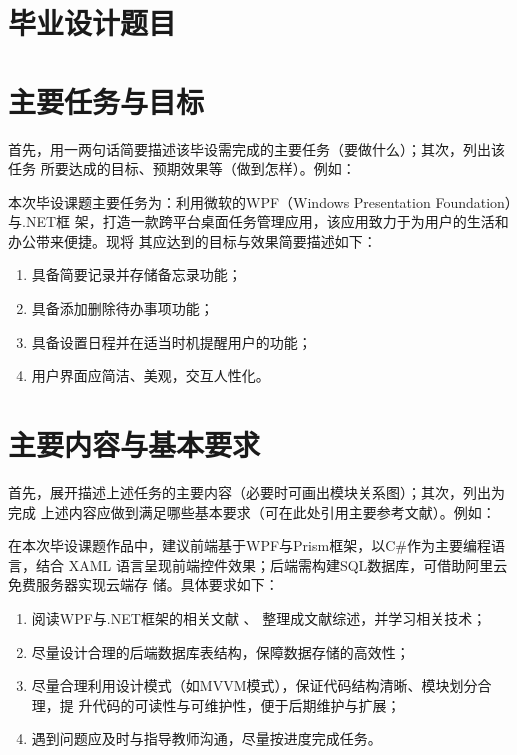 \section{毕业设计题目}

\makeatletter
\@title %
\makeatother

\section{主要任务与目标}

\begin{tcolorbox}
	首先，用一两句话简要描述该毕设需完成的主要任务（要做什么）；其次，列出该任务
	所要达成的目标、预期效果等（做到怎样）。例如：
\end{tcolorbox}

本次毕设课题主要任务为：利用微软的WPF（Windows Presentation Foundation）与.NET框
架，打造一款跨平台桌面任务管理应用，该应用致力于为用户的生活和办公带来便捷。现将
其应达到的目标与效果简要描述如下：
\begin{enumerate}
	\item 具备简要记录并存储备忘录功能；
	\item 具备添加删除待办事项功能；
	\item 具备设置日程并在适当时机提醒用户的功能；
	\item 用户界面应简洁、美观，交互人性化。
\end{enumerate}

\section{主要内容与基本要求}

\begin{tcolorbox}
	首先，展开描述上述任务的主要内容（必要时可画出模块关系图）；其次，列出为完成
	上述内容应做到满足哪些基本要求（可在此处引用主要参考文献）。例如：
\end{tcolorbox}

在本次毕设课题作品中，建议前端基于WPF与Prism框架，以C\#作为主要编程语言，结合
XAML 语言呈现前端控件效果；后端需构建SQL数据库，可借助阿里云免费服务器实现云端存
储。具体要求如下：
\begin{enumerate}
	\item 阅读WPF与.NET框架的相关文献
	      \cite{chen1980zhongguo,chen2005zhulu,chu2004tushu,yuan2012lanc,lamport1986document,niu2013zonghe,Bohan1928,Dubrovin1906,hls2012jinji,wikibook2014latex}、
	      整理成文献综述，并学习相关技术；
	\item 尽量设计合理的后端数据库表结构，保障数据存储的高效性；
	\item 尽量合理利用设计模式（如MVVM模式），保证代码结构清晰、模块划分合理，提
	      升代码的可读性与可维护性，便于后期维护与扩展；
	\item 遇到问题应及时与指导教师沟通，尽量按进度完成任务。
\end{enumerate}

